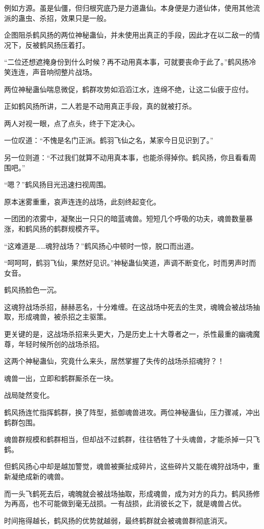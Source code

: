 \begin{this_body}
例如方源。虽是仙僵，但归根究底乃是力道蛊仙。本身便是力道仙体，使用其他流派的蛊虫、杀招，效果只是一般。

企图阻杀鹤风扬的两位神秘蛊仙，并未使用出真正的手段，因此才在以二敌一的情况下，反被鹤风扬压着打。

“二位还想遮掩身份到什么时候？再不动用真本事，可就要丧命于此了。”鹤风扬冷笑连连，声音响彻整片战场。

两位神秘蛊仙喘息微促，鹤群攻势如滔滔江水，连绵不绝，让这二仙疲于应付。

正如鹤风扬所讲，二人若是不动用真正手段，真的就被打杀。

两人对视一眼，点了点头，终于下定决心。

一位叹道：“不愧是名门正派。鹤羽飞仙之名，某家今日见识到了。”

另一位则道：“不过我们就算不动用真本事，也能杀得掉你。鹤风扬，你且看看周围吧。”

“嗯？”鹤风扬目光迅速扫视周围。

原本迷雾重重，哀声连连的战场，此刻终起变化。

一团团的浓雾中，凝聚出一只只的暗蓝魂兽。短短几个呼吸的功夫，魂兽数量暴涨，和鹤风扬的鹤群规模齐平。

“这难道是……魂狩战场？”鹤风扬心中顿时一惊，脱口而出道。

“呵呵呵，鹤羽飞仙，果然好见识。”神秘蛊仙笑道，声调不断变化，时而男声时而女音。

鹤风扬脸色一沉。

这魂狩战场杀招，赫赫恶名，十分难缠。在这战场中死去的生灵，魂魄会被战场抽取，形成魂兽，被杀招之主驱策。

更关键的是，这战场杀招来头更大，乃是历史上十大尊者之一，杀性最重的幽魂魔尊，年轻时候所创的战场杀招。

这两个神秘蛊仙，究竟什么来头，居然掌握了失传的战场杀招魂狩？！

魂兽一出，立即和鹤群厮杀在一块。

战局陡然变化。

鹤风扬连忙指挥鹤群，换了阵型，抵御魂兽进攻。两位神秘蛊仙，压力骤减，冲出鹤群包围。

魂兽群规模和鹤群相当，但却战不过鹤群，往往牺牲了十头魂兽，才能杀掉一只飞鹤。

但鹤风扬心中却是越加警觉，魂兽被撕扯成碎片，这些碎片又能在魂狩战场中，重新凝绝成新的魂兽。

而一头飞鹤死去后，魂魄就会被战场抽取，形成魂兽，成为对方的兵力。鹤风扬修为再高，也不可能做到毫无战损。一有战损，此消彼长之下，就是魂兽占优。

时间拖得越长，鹤风扬的优势就越弱，最终鹤群就会被魂兽群彻底消灭。


\end{this_body}
